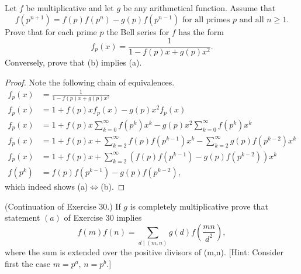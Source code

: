\begin{exercise}
Let $f$ be multiplicative and let $g$ be any arithmetical function. Assume that
\[f\left(p^{n+1}\right)=f(p)f\left(p^n\right)-g(p)f\left(p^{n-1}\right)\text{  for all primes }p\text{ and all }n\ge1.\tag{a}\]
Prove that for each prime $p$ the Bell series for $f$ has the form
\[f_p(x)=\frac1{1-f(p)x+g(p)x^2}.\tag{b}\]
Conversely, prove that (b) implies (a).
\end{exercise}

\begin{proof}
Note the following chain of equivalences.
\begin{align*}
    f_p(x) &= \frac1{1-f(p)x+g(p)x^2} \\
    f_p(x) &= 1+f(p)xf_p(x)-g(p)x^2f_p(x) \\
    f_p(x) &= 1+f(p)x\sum_{k=0}^\infty f\left(p^k\right)x^k-g(p)x^2\sum_{k=0}^\infty f\left(p^k\right)x^k \\
    f_p(x) &= 1+f(p)x+\sum_{k=2}^\infty f(p)f\left(p^{k-1}\right)x^k-\sum_{k=2}^\infty g(p)f\left(p^{k-2}\right)x^k \\
    f_p(x) &= 1+f(p)x+\sum_{k=2}^\infty\left(f(p)f\left(p^{k-1}\right)-g(p)f\left(p^{k-2}\right)\right)x^k \\
    f\left(p^k\right) &= f(p)f\left(p^{k-1}\right)-g(p)f\left(p^{k-2}\right),
\end{align*}
which indeed shows (a)$\iff$(b).
\end{proof}

\begin{exercise}
(Continuation of Exercise 30.) If $g$ is completely multiplicative prove that statement $(a)$ of Exercise 30 implies
\[f(m)f(n)=\sum_{d\mid(m,n)}g(d)f\left(\frac {mn}{d^2}\right),\]
where the sum is extended over the positive divisors of (m,n). [Hint: Consider first the case $m=p^a,\,n=p^b.$]
\end{exercise}

